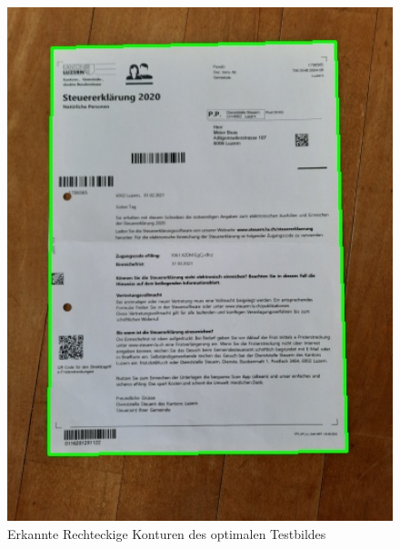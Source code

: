 \begin{figure}[H]
\begin{minipage}[t]{0.32\linewidth}
  \includegraphics[width=1.0\textwidth]{img/piktogrammerkennung/contours_doc.jpg}
  \caption{Erkannte Rechteckige Konturen des optimalen Testbildes}
  \label{fig:contour-doc}
  \end{minipage}
  \hfill
  \begin{minipage}[t]{0.32\linewidth}

\end{minipage}
\end{figure}
